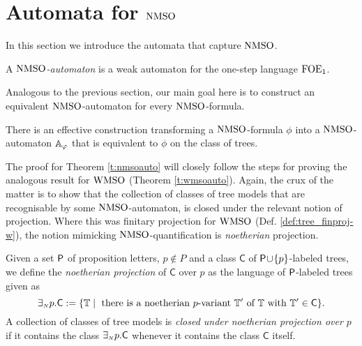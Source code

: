 
\section{Automata for $\mathrm{NMSO}$}
   \label{sec:autnmso}

In this section we introduce the automata that capture $\mathrm{NMSO}$.

\begin{definition}
A \emph{$\mathrm{NMSO}$-automaton} is a weak automaton for the one-step language $\mathrm{FOE}_1$.
\end{definition}

Analogous to the previous section, our main goal here is to construct an
equivalent $\mathrm{NMSO}$-automaton for every $\mathrm{NMSO}$-formula.

\begin{theorem}
\label{t:nmsoauto}
There is an effective construction transforming a $\mathrm{NMSO}$-formula $\phi$
into a $\mathrm{NMSO}$-automaton $\mathbb{A}_{\varphi}$ that is equivalent
to $\phi$ on the class of trees.
\end{theorem}

The proof for Theorem \ref{t:nmsoauto} will closely follow the steps for proving
the analogous result for $\mathrm{WMSO}$ (Theorem \ref{t:wmsoauto}).
Again, the crux of the matter is to show that the collection of classes of tree
models that are recognisable by some $\mathrm{NMSO}$-automaton, is closed under the 
relevant notion of projection.
Where this was finitary projection for $\mathrm{WMSO}$ (Def. \ref{def:tree_finproj-w}),
the notion mimicking $\mathrm{NMSO}$-quantification is \emph{noetherian} projection.

\begin{definition}\label{def:tree_finproj-n}
Given a set $\mathsf{P}$ of proposition letters, $p \not\in P$ and a class 
$\mathsf{C}$ of $\mathsf{P}\!\cup\!\{p\}$-labeled trees, we define the \emph{noetherian 
projection} of $\mathsf{C}$ over $p$ as the language of $\mathsf{P}$-labeled trees 
given as 
$$
\exists_{{\scriptscriptstyle N}} p.\mathsf{C} \mathrel{: =} \{\mathbb{T} \mid 
   \text{ there is a noetherian $p$-variant } \mathbb{T}' \text{ of } \mathbb{T} 
   \text{ with } \mathbb{T}' \in \mathsf{C}\}.
$$
A collection of classes of tree models is \emph{closed under noetherian 
projection over $p$} if it contains the class ${{\exists_{{\scriptscriptstyle N}}} p}.\mathsf{C}$
whenever it contains the class $\mathsf{C}$ itself.
\end{definition}

